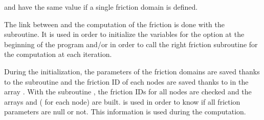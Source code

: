 \begin{tabular}{|p{}|p{2.5in}|} \hline
\end{tabular}


 and 
have the same value if a single friction domain is defined.





The link between  and the computation of the friction is done
with the  subroutine.
It is used in order to initialize the variables for the option
 at the beginning of the program and/or in order to call
the right friction subroutine for the computation at each iteration.

\textbf{}

During the initialization, the parameters of the friction domains are saved
thanks to the  subroutine and the friction ID of each nodes
are saved thanks to  in the array .
With the subroutine , the friction IDs for all nodes are
checked and the arrays  and 
( for each node) are built.
 is used in order to know if all friction parameters are null or
not.
This information is used during the computation.

\textbf{}

